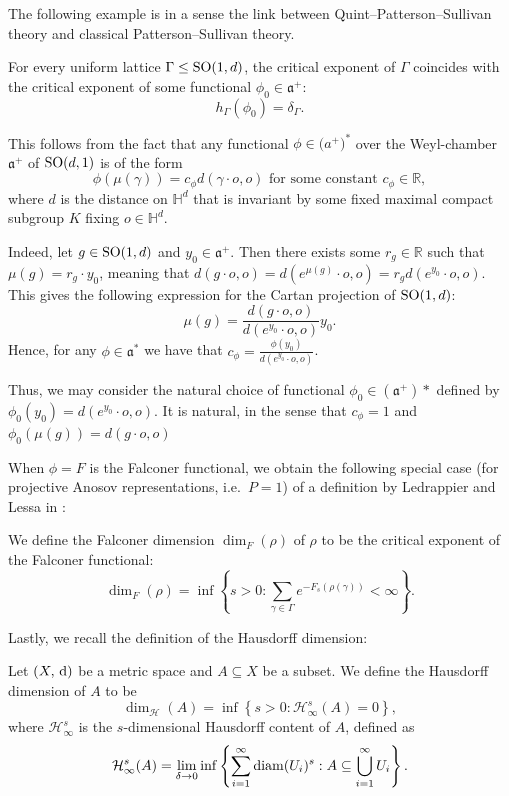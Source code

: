 \documentclass{report}
\begin{document}
The following example is in a sense the link between Quint--Patterson--Sullivan theory and classical Patterson--Sullivan theory.
\begin{example}
    \label{ex:critical_exponent}
    For every uniform lattice $\Gamma \leq \operatorname{{\mathrm{SO}}}(1,d)$, the critical exponent of $\Gamma$ coincides with the critical exponent of some functional $\phi_0 \in \mathfrak a^+$:
    \[
    h_\Gamma (\phi_0) = \delta_\Gamma.
    \]
    
    This follows from the fact that any functional $\phi \in \mathfrak (a^+)^*$ over the Weyl-chamber $\mathfrak a^+$ of $\operatorname{{\mathrm{SO}}}(d,1)$ is of the form
    \[
        \phi(\mu(\gamma)) = c_\phi d(\gamma \cdot o, o) \text{ for some constant } c_\phi \in \mathbb R,
    \]
    where $d$ is the distance on $\mathbb H^d$ that is invariant by some fixed maximal compact subgroup $K$ fixing $o \in \mathbb H^d$.

    Indeed, let $g \in \operatorname{{\mathrm{SO}}}(1, d)$ and $y_0 \in \mathfrak a^+$.
    Then there exists some $r_g \in \mathbb R$ such that $\mu(g) = r_g \cdot y_0$, meaning that
    $d(g \cdot o, o) = d(e^{\mu(g)} \cdot o, o) = r_g d(e^{y_0} \cdot o, o)$.
    This gives the following expression for the Cartan projection of $\operatorname{{\mathrm{SO}}}(1,d)$:
    \[
    \mu(g) = \frac{d(g \cdot o, o)}{d(e^{y_0} \cdot o, o)} y_0.
    \]
    Hence, for any $\phi \in \mathfrak a^*$ we have that $c_\phi = \frac{\phi(y_0)}{d(e^{y_0} \cdot o, o)}$.

    Thus, we may consider the natural choice of functional $\phi_0 \in (\mathfrak a^+)*$ defined by $\phi_0(y_0) = d(e^{y_0} \cdot o, o)$.
    It is natural, in the sense that $c_\phi = 1$ and $\phi_0(\mu(g)) = d(g \cdot o, o)$
\end{example}


When $\phi = F$ is the Falconer functional, we obtain the following special case (for projective Anosov representations, i.e.\ $P = {1}$) of a definition by Ledrappier and Lessa in \cite{ledrappier_dimension_2023}:
\begin{definition}
    We define the Falconer dimension $\dim_F(\rho)$ of $\rho$ to be the critical exponent of the Falconer functional:
    \[
        \dim_F(\rho) = \inf
        \left\{
            s > 0: \sum_{\gamma \in \Gamma} e^{-F_s(\rho(\gamma))} < \infty
        \right\}.
    \]
\end{definition}

Lastly, we recall the definition of the Hausdorff dimension:
\begin{definition}\label{def:hausdorff_dimension}
    Let $(X,\,\mathrm{d})$ be a metric space and $A \subseteq X$ be a subset.
    We define the Hausdorff dimension of $A$ to be
    \[
        \dim_{\mathcal H}(A) = \inf
        \left\{
            s > 0: \mathcal H^s_\infty(A) = 0
        \right\},
    \]
    where $\mathcal H^s_\infty$ is the $s$-dimensional Hausdorff content of $A$, defined as
    \[
        \mathcal H^s_\infty(A) = \lim_{\delta \to 0} \inf
        \left\{
            \sum_{i=1}^\infty \operatorname{diam}(U_i)^s: A \subseteq \bigcup_{i=1}^\infty U_i
        \right\}.
    \]
\end{definition}
\end{document}
